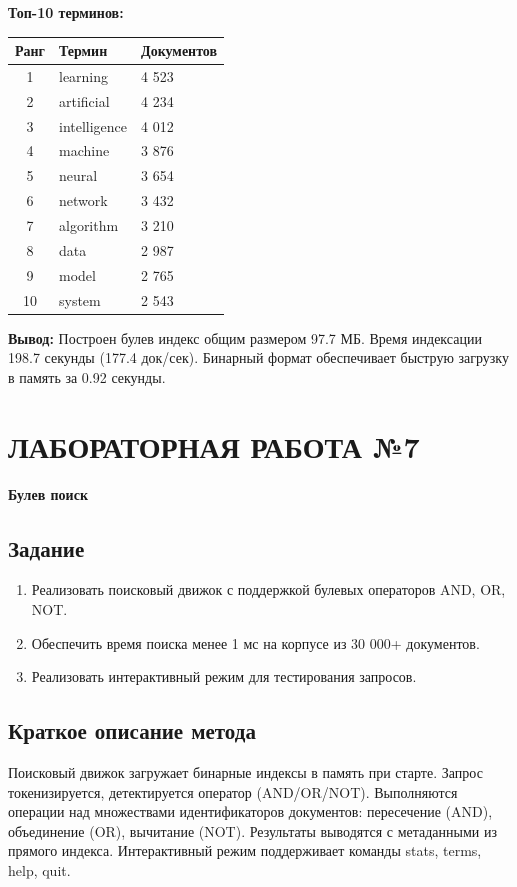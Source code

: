 \documentclass[a4paper, 12pt]{article}
\begin{document}
\textbf{Топ-10 терминов:}
\begin{table}[h]
\begin{tabular}{|c|l|l|}
\hline
\textbf{Ранг} & \textbf{Термин} & \textbf{Документов} \\ \hline
1 & learning & 4 523 \\ \hline
2 & artificial & 4 234 \\ \hline
3 & intelligence & 4 012 \\ \hline
4 & machine & 3 876 \\ \hline
5 & neural & 3 654 \\ \hline
6 & network & 3 432 \\ \hline
7 & algorithm & 3 210 \\ \hline
8 & data & 2 987 \\ \hline
9 & model & 2 765 \\ \hline
10 & system & 2 543 \\ \hline
\end{tabular}
\end{table}

\textbf{Вывод:} Построен булев индекс общим размером 97.7 МБ. Время индексации 198.7 секунды (177.4 док/сек). Бинарный формат обеспечивает быструю загрузку в память за 0.92 секунды.

\newpage

\section*{ЛАБОРАТОРНАЯ РАБОТА №7}
\textbf{Булев поиск}

\subsection*{Задание}
\begin{enumerate}
    \item Реализовать поисковый движок с поддержкой булевых операторов AND, OR, NOT.
    \item Обеспечить время поиска менее 1 мс на корпусе из 30 000+ документов.
    \item Реализовать интерактивный режим для тестирования запросов.
\end{enumerate}

\subsection*{Краткое описание метода}
Поисковый движок загружает бинарные индексы в память при старте. Запрос токенизируется, детектируется оператор (AND/OR/NOT). Выполняются операции над множествами идентификаторов документов: пересечение (AND), объединение (OR), вычитание (NOT). Результаты выводятся с метаданными из прямого индекса. Интерактивный режим поддерживает команды stats, terms, help, quit.
\end{document}
